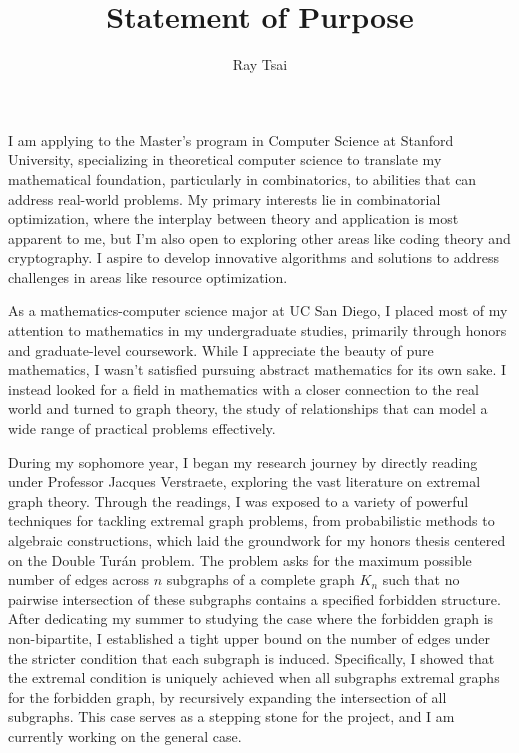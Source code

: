\documentclass[12pt]{article}
\title{Statement of Purpose}
\author{Ray Tsai}
\date{}
\begin{document}
\maketitle

\vspace{-0.25in}

I am applying to the Master's program in Computer Science at Stanford University, specializing in
theoretical computer science to translate my mathematical foundation, particularly in combinatorics,
to abilities that can address real-world problems. My primary interests lie in combinatorial
optimization, where the interplay between theory and application is most apparent to me, but I'm
also open to exploring other areas like coding theory and cryptography. I aspire to develop
innovative algorithms and solutions to address challenges in areas like resource optimization.

As a mathematics-computer science major at UC San Diego, I placed most of my attention to
mathematics in my undergraduate studies, primarily through honors and graduate-level coursework.
While I appreciate the beauty of pure mathematics, I wasn't satisfied pursuing abstract mathematics
for its own sake. I instead looked for a field in mathematics with a closer connection to the real
world and turned to graph theory, the study of relationships that can model a wide range of
practical problems effectively.

During my sophomore year, I began my research journey by directly reading under Professor Jacques
Verstraete, exploring the vast literature on extremal graph theory. Through the readings, I was
exposed to a variety of powerful techniques for tackling extremal graph problems, from probabilistic
methods to algebraic constructions, which laid the groundwork for my honors thesis centered on the
Double Turán problem. The problem asks for the maximum possible number of edges across $n$ subgraphs
of a complete graph $K_n$ such that no pairwise intersection of these subgraphs contains a specified
forbidden structure. After dedicating my summer to studying the case where the forbidden graph is
non-bipartite, I established a tight upper bound on the number of edges under the stricter condition
that each subgraph is induced. Specifically, I showed that the extremal condition is uniquely
achieved when all subgraphs extremal graphs for the forbidden graph, by recursively expanding the
intersection of all subgraphs. This case serves as a stepping stone for the project, and I am
currently working on the general case. 
\end{document}
